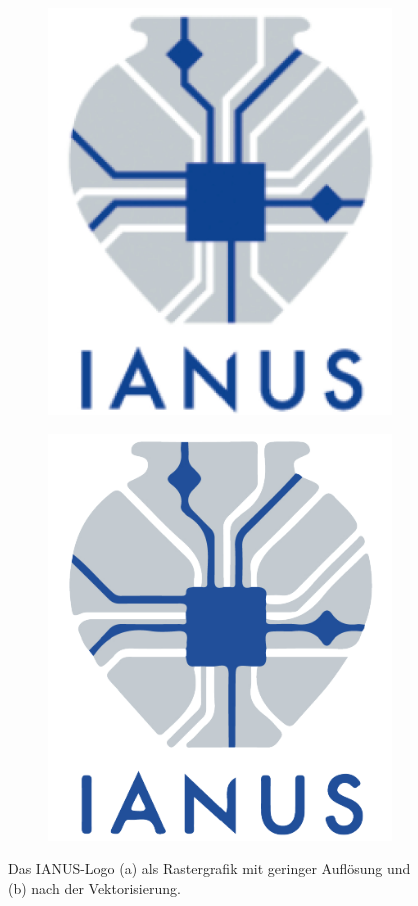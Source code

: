 \begin{figure}
\centering
  \begin{subfigure}{.245\textwidth}
  \centering
  \includegraphics[width=.7\linewidth]{bilder/vektor_vektorisierungFlaechenA.pdf}
  \caption{}
\end{subfigure}%
\begin{subfigure}{.245\textwidth}
  \centering
  \includegraphics[width=.7\linewidth]{bilder/vektor_vektorisierungFlaechenB.pdf}
  \caption{}
\end{subfigure}
  \caption{Das IANUS-Logo (a) als Rastergrafik mit geringer Auflösung und (b) nach der Vektorisierung.}
	\label{abb:vektor_vektorisierungFlaechen}
\end{figure}
